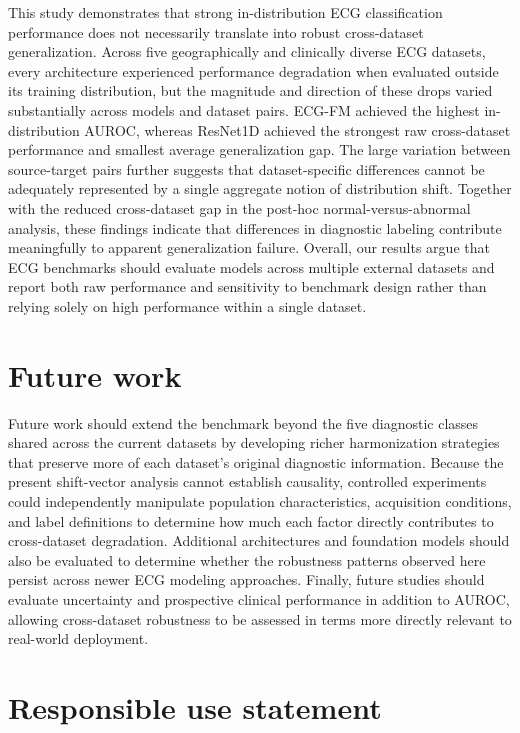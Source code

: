 \documentclass{article}
\begin{document}
This study demonstrates that strong in-distribution ECG classification performance does not necessarily translate into robust cross-dataset generalization. Across five geographically and clinically diverse ECG datasets, every architecture experienced performance degradation when evaluated outside its training distribution, but the magnitude and direction of these drops varied substantially across models and dataset pairs. ECG-FM achieved the highest in-distribution AUROC, whereas ResNet1D achieved the strongest raw cross-dataset performance and smallest average generalization gap. The large variation between source-target pairs further suggests that dataset-specific differences cannot be adequately represented by a single aggregate notion of distribution shift. Together with the reduced cross-dataset gap in the post-hoc normal-versus-abnormal analysis, these findings indicate that differences in diagnostic labeling contribute meaningfully to apparent generalization failure. Overall, our results argue that ECG benchmarks should evaluate models across multiple external datasets and report both raw performance and sensitivity to benchmark design rather than relying solely on high performance within a single dataset.

\section{Future work}

Future work should extend the benchmark beyond the five diagnostic classes shared across the current datasets by developing richer harmonization strategies that preserve more of each dataset's original diagnostic information. Because the present shift-vector analysis cannot establish causality, controlled experiments could independently manipulate population characteristics, acquisition conditions, and label definitions to determine how much each factor directly contributes to cross-dataset degradation. Additional architectures and foundation models should also be evaluated to determine whether the robustness patterns observed here persist across newer ECG modeling approaches. Finally, future studies should evaluate uncertainty and prospective clinical performance in addition to AUROC, allowing cross-dataset robustness to be assessed in terms more directly relevant to real-world deployment.

\section{Responsible use statement}
\end{document}
